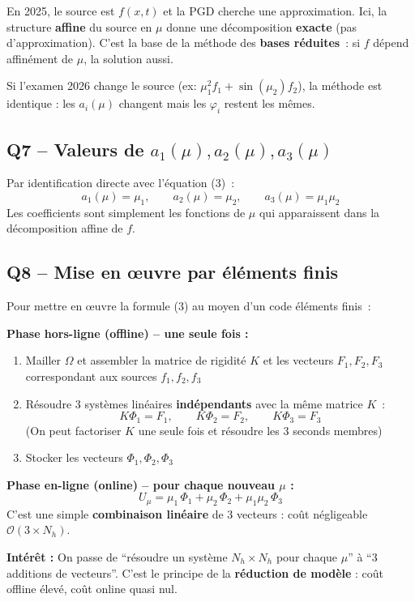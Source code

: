 \documentclass[11pt,a4paper]{article}
\begin{document}
\begin{linkbox}
En 2025, le source est $f(x,t)$ et la PGD cherche une approximation. Ici, la structure \textbf{affine} du source en $\mu$ donne une d\'ecomposition \textbf{exacte} (pas d'approximation). C'est la base de la m\'ethode des \textbf{bases r\'eduites}~: si $f$ d\'epend affin\'ement de $\mu$, la solution aussi.

Si l'examen 2026 change le source (ex: $\mu_1^2 f_1 + \sin(\mu_2) f_2$), la m\'ethode est identique : les $a_i(\mu)$ changent mais les $\varphi_i$ restent les m\^emes.
\end{linkbox}

\subsection{Q7 -- Valeurs de $a_1(\mu), a_2(\mu), a_3(\mu)$}

\begin{formulabox}[Solution]
Par identification directe avec l'\'equation (3)~:
\[
\boxed{a_1(\mu) = \mu_1, \qquad a_2(\mu) = \mu_2, \qquad a_3(\mu) = \mu_1\mu_2}
\]
Les coefficients sont simplement les fonctions de $\mu$ qui apparaissent dans la d\'ecomposition affine de $f$.
\end{formulabox}

\subsection{Q8 -- Mise en \oe{}uvre par \'el\'ements finis}

\begin{formulabox}[Solution]
Pour mettre en \oe{}uvre la formule (3) au moyen d'un code \'el\'ements finis~:

\textbf{Phase hors-ligne (offline) -- une seule fois :}
\begin{enumerate}[nosep]
\item Mailler $\Omega$ et assembler la matrice de rigidit\'e $K$ et les vecteurs $F_1, F_2, F_3$ correspondant aux sources $f_1, f_2, f_3$
\item R\'esoudre 3 syst\`emes lin\'eaires \textbf{ind\'ependants} avec la m\^eme matrice $K$~:
\[
K\Phi_1 = F_1, \qquad K\Phi_2 = F_2, \qquad K\Phi_3 = F_3
\]
(On peut factoriser $K$ une seule fois et r\'esoudre les 3 seconds membres)
\item Stocker les vecteurs $\Phi_1, \Phi_2, \Phi_3$
\end{enumerate}

\textbf{Phase en-ligne (online) -- pour chaque nouveau $\mu$ :}
\[
\boxed{U_\mu = \mu_1\,\Phi_1 + \mu_2\,\Phi_2 + \mu_1\mu_2\,\Phi_3}
\]
C'est une simple \textbf{combinaison lin\'eaire} de 3 vecteurs : co\^ut n\'egligeable $\mathcal{O}(3 \times N_h)$.

\medskip
\textbf{Int\'er\^et :} On passe de ``r\'esoudre un syst\`eme $N_h \times N_h$ pour chaque $\mu$'' \`a ``3 additions de vecteurs''. C'est le principe de la \textbf{r\'eduction de mod\`ele} : co\^ut offline \'elev\'e, co\^ut online quasi nul.
\end{formulabox}
\end{document}
